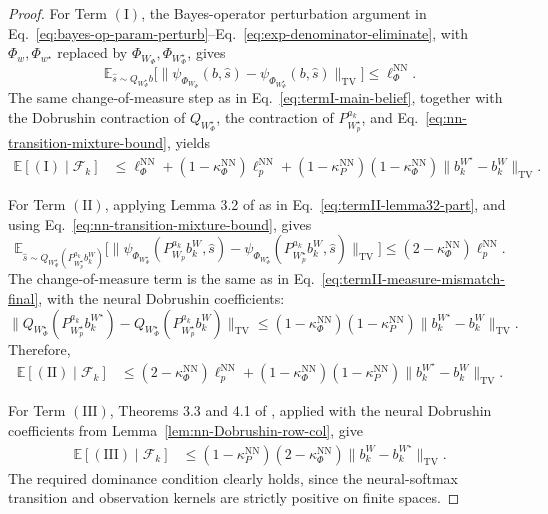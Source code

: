 \documentclass[10pt]{article} %
\theoremstyle{plain}
\theoremstyle{definition}
\theoremstyle{remark}
\newcommand{\bE}{\mathbb{E}}
\begin{document}
\begin{proof}
For Term \(\mathrm{(I)}\), the Bayes-operator perturbation argument in Eq.~\ref{eq:bayes-op-param-perturb}--Eq.~\ref{eq:exp-denominator-eliminate}, with \(\Phi_w,\Phi_{w^\star}\) replaced by \(\Phi_{W_\Phi},\Phi_{W_\Phi^\star}\), gives
\[
\bE_{\hat s\sim Q_{W_\Phi^\star}b}
\Big[\|\psi_{\Phi_{W_\Phi}}(b,\hat s)-\psi_{\Phi_{W_\Phi^\star}}(b,\hat s)\|_{\mathrm{TV}}\Big]
\le \ell_\Phi^{\mathrm{NN}}.
\]
The same change-of-measure step as in Eq.~\ref{eq:termI-main-belief}, together with the Dobrushin contraction of \(Q_{W_\Phi^\star}\), the contraction of \(P_{W_p^\star}^{a_k}\), and Eq.~\ref{eq:nn-transition-mixture-bound}, yields
\begin{align}
\bE[\mathrm{(I)}\mid\mathcal F_k]
&\le \ell_\Phi^{\mathrm{NN}}+(1-\kappa_\Phi^{\mathrm{NN}})\ell_p^{\mathrm{NN}}
+(1-\kappa_P^{\mathrm{NN}})(1-\kappa_\Phi^{\mathrm{NN}})
\|b_k^{W^\star}-b_k^W\|_{\mathrm{TV}}. \label{eq:nn-I-final-bound}
\end{align}

For Term \(\mathrm{(II)}\), applying Lemma 3.2 of \citet{Mcdonald2024StochasticCriteria} as in Eq.~\ref{eq:termII-lemma32-part}, and using Eq.~\ref{eq:nn-transition-mixture-bound}, gives
\[
\bE_{\hat s\sim Q_{W_\Phi^\star}(P_{W_p^\star}^{a_k}b_k^W)}
\Big[\|\psi_{\Phi_{W_\Phi^\star}}(P_{W_p}^{a_k}b_k^W,\hat s)-\psi_{\Phi_{W_\Phi^\star}}(P_{W_p^\star}^{a_k}b_k^W,\hat s)\|_{\mathrm{TV}}\Big]
\le (2-\kappa_\Phi^{\mathrm{NN}})\ell_p^{\mathrm{NN}}.
\]
The change-of-measure term is the same as in Eq.~\ref{eq:termII-measure-mismatch-final}, with the neural Dobrushin coefficients:
\[
\Big\|Q_{W_\Phi^\star}(P_{W_p^\star}^{a_k}b_k^{W^\star})-Q_{W_\Phi^\star}(P_{W_p^\star}^{a_k}b_k^W)\Big\|_{\mathrm{TV}}
\le (1-\kappa_\Phi^{\mathrm{NN}})(1-\kappa_P^{\mathrm{NN}})\|b_k^{W^\star}-b_k^W\|_{\mathrm{TV}}.
\]
Therefore,
\begin{align}
\bE[\mathrm{(II)}\mid\mathcal F_k]
&\le (2-\kappa_\Phi^{\mathrm{NN}})\ell_p^{\mathrm{NN}}
+(1-\kappa_\Phi^{\mathrm{NN}})(1-\kappa_P^{\mathrm{NN}})
\|b_k^{W^\star}-b_k^W\|_{\mathrm{TV}}. \label{eq:nn-II-final-bound}
\end{align}

For Term \(\mathrm{(III)}\), Theorems 3.3 and 4.1 of \citet{Mcdonald2024StochasticCriteria}, applied with the neural Dobrushin coefficients from Lemma~\ref{lem:nn-Dobrushin-row-col}, give
\begin{align}
\bE[\mathrm{(III)}\mid\mathcal F_k]
&\le (1-\kappa_P^{\mathrm{NN}})(2-\kappa_\Phi^{\mathrm{NN}})
\|b_k^W-b_k^{W^\star}\|_{\mathrm{TV}}. \label{eq:nn-III-final-bound}
\end{align}
The required dominance condition clearly holds, since the neural-softmax transition and observation kernels are strictly positive on finite spaces.


\end{proof}
\end{document}
